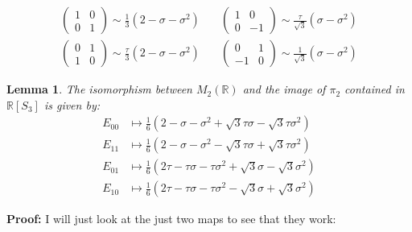 \documentclass[a5paper]{article}
\renewcommand{\t}{\tau}
\newcommand{\s}{\sigma}
\newcommand{\R}{\mathbb{R}}
\newtheorem{lemma}{Lemma}
\begin{document}
\begin{align*}
\left(\begin{smallmatrix}1&0\\0&1\end{smallmatrix}\right) 
    \sim \frac{1}{3}(2 - \s - \s^2) &\quad
\left(\begin{smallmatrix}1&0\\0&-1\end{smallmatrix}\right) 
    \sim \frac{\t}{\sqrt3}(\s - \s^2) \\
\left(\begin{smallmatrix}0&1\\1&0\end{smallmatrix}\right) 
    \sim \frac{\t}{3}(2 - \s - \s^2) &\quad
\left(\begin{smallmatrix}0&1\\-1&0\end{smallmatrix}\right) 
    \sim \frac{1}{\sqrt3}(\s - \s^2) 
\end{align*}

\begin{lemma}
    The isomorphism between $M_2(\R)$ and the image of $\pi_2$ contained in
    $\R[S_3]$ is given by:
    \begin{align*}
        E_{00} &\mapsto \frac{1}{6}\left(
          2 - \s - \s^2 + \sqrt 3 \t\s - \sqrt 3 \t\s^2 \right) \\
        E_{11} &\mapsto \frac{1}{6}\left(
          2 - \s - \s^2 - \sqrt 3 \t\s + \sqrt 3 \t\s^2 \right) \\
        E_{01} &\mapsto \frac{1}{6}\left(
          2\t -\t\s -\t\s^2 + \sqrt3\s - \sqrt3\s^2 \right) \\
        E_{10} &\mapsto \frac{1}{6}\left(
          2\t -\t\s -\t\s^2 - \sqrt3\s + \sqrt3\s^2 \right) 
    \end{align*}
\end{lemma}

\textbf{Proof:} I will just look at the just two maps to see that they work:
\end{document}
